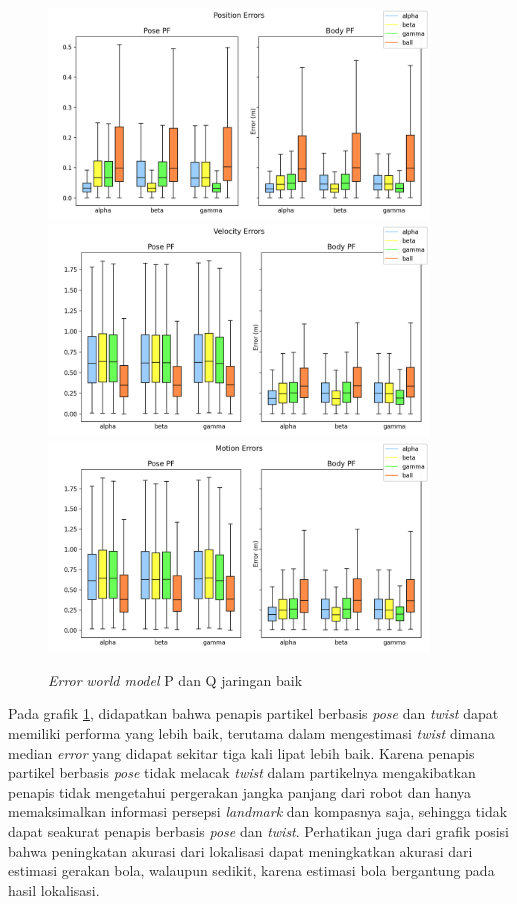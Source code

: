 \begin{figure}[p]
    \centering
    \medskip
    \includegraphics[width=0.9\textwidth]{resources/cfg1_AP_AQ_error_pos.png}
    \includegraphics[width=0.9\textwidth]{resources/cfg1_AP_AQ_error_vel.png}
    \includegraphics[width=0.9\textwidth]{resources/cfg1_AP_AQ_error_motion.png}
    \caption{\textit{Error} \textit{world model} P dan Q jaringan baik}
    \label{fig:1-p-q-error}
    \bigskip
\end{figure}

Pada grafik \ref{fig:1-p-q-error}, didapatkan bahwa penapis partikel berbasis \textit{pose} dan \textit{twist} dapat memiliki performa yang lebih baik, terutama dalam mengestimasi \textit{twist} dimana median \textit{error} yang didapat sekitar tiga kali lipat lebih baik. Karena penapis partikel berbasis \textit{pose} tidak melacak \textit{twist} dalam partikelnya mengakibatkan penapis tidak mengetahui pergerakan jangka panjang dari robot dan hanya memaksimalkan informasi persepsi \textit{landmark} dan kompasnya saja, sehingga tidak dapat seakurat penapis berbasis \textit{pose} dan \textit{twist}. Perhatikan juga dari grafik posisi bahwa peningkatan akurasi dari lokalisasi dapat meningkatkan akurasi dari estimasi gerakan bola, walaupun sedikit, karena estimasi bola bergantung pada hasil lokalisasi.

